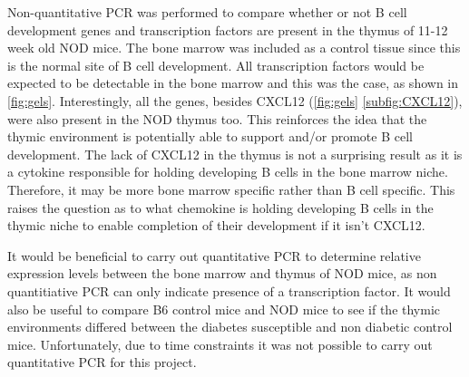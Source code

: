 Non-quantitative PCR was performed to compare whether or not B cell development genes and transcription factors are present in the thymus of 11-12 week old NOD mice.
The bone marrow was included as a control tissue since this is the normal site of B cell development.
All transcription factors would be expected to be detectable in the bone marrow and this was the case, as shown in \cref{fig:gels}.
Interestingly, all the genes, besides CXCL12 (\cref{fig:gels} \ref{subfig:CXCL12}), were also present in the NOD thymus too.
This reinforces the idea that the thymic environment is potentially able to support and/or promote B cell development.
The lack of CXCL12 in the thymus is not a surprising result as it is a cytokine responsible for holding developing B cells in the bone marrow niche. Therefore, it may be more bone marrow specific rather than B cell specific.
This raises the question as to what chemokine is holding developing B cells in the thymic niche to enable completion of their development if it isn't CXCL12.

It would be beneficial to carry out quantitative PCR to determine relative expression levels between the bone marrow and thymus of NOD mice, as non quantitiative PCR can only indicate presence of a transcription factor.
It would also be useful to compare B6 control mice and NOD mice to see if the thymic environments differed between the diabetes susceptible and non diabetic control mice.
Unfortunately, due to time constraints it was not possible to carry out quantitative PCR for this project.

